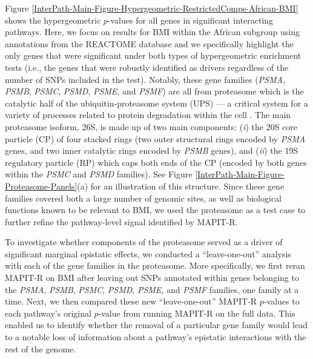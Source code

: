 \documentclass[10pt]{article}
\begin{document}
Figure \ref{InterPath-Main-Figure-Hypergeometric-RestrictedComps-African-BMI} shows the hypergeometric $p$-values for all genes in significant interacting pathways. Here, we focus on results for BMI within the African subgroup using annotations from the REACTOME database and we specifically highlight the only genes that were significant under both types of hypergeometric enrichment tests (i.e., the genes that were robustly identified as drivers regardless of the number of SNPs included in the test). Notably, these gene families (\textit{PSMA}, \textit{PSMB}, \textit{PSMC}, \textit{PSMD}, \textit{PSME}, and \textit{PSMF}) are all from proteasome which is the catalytic half of the ubiquitin-proteasome system (UPS) --- a critical system for a variety of processes related to protein degradation within the cell \cite{Voges1999,Livneh2016,Collins2017}. The main proteasome isoform, 26S, is made up of two main components: (\textit{i}) the 20S core particle (CP) of four stacked rings (two outer structural rings encoded by \textit{PSMA} genes, and two inner catalytic rings encoded by \textit{PSMB} genes), and (\textit{ii}) the 19S regulatory particle (RP) which caps both ends of the CP (encoded by both genes within the \textit{PSMC} and \textit{PSMD} families). See Figure \ref{InterPath-Main-Figure-Proteasome-Panels}(a) for an illustration of this structure. Since these gene families covered both a large number of genomic sites, as well as biological functions known to be relevant to BMI, we used the proteasome as a test case to further refine the pathway-level signal identified by MAPIT-R.
 
To investigate whether components of the proteasome served as a driver of significant marginal epistatic effects, we conducted a ``leave-one-out'' analysis with each of the gene families in the proteasome. More specifically, we first reran MAPIT-R on BMI after leaving out SNPs annotated within genes belonging to the \textit{PSMA}, \textit{PSMB}, \textit{PSMC}, \textit{PSMD}, \textit{PSME}, and \textit{PSMF} families, one family at a time. Next, we then compared these new ``leave-one-out'' MAPIT-R $p$-values to each pathway's original $p$-value from running MAPIT-R on the full data. This enabled us to identify whether the removal of a particular gene family would lead to a notable loss of information about a pathway's epistatic interactions with the rest of the genome. 
 
\end{document}

